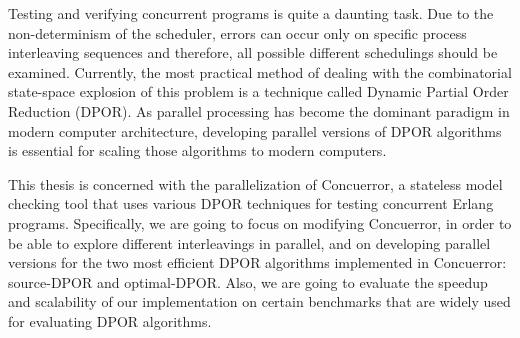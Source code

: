 Testing and verifying concurrent programs is quite a daunting task. Due to the non-determinism of the scheduler,
errors can occur only on specific process interleaving sequences and therefore, all possible different
schedulings should be examined. Currently, the most practical method of dealing with the combinatorial state-space
explosion of this problem is a technique called Dynamic Partial Order Reduction (DPOR). As parallel processing
has become the dominant paradigm in modern computer architecture, developing parallel versions of DPOR algorithms is essential 
for scaling those algorithms to modern computers.

This thesis is concerned with the parallelization of Concuerror, a stateless model checking tool that uses various
DPOR techniques for testing concurrent Erlang programs. Specifically, we are going to focus on modifying Concuerror, 
in order to be able to explore different interleavings in parallel, and on developing parallel
versions for the two most efficient DPOR algorithms implemented in Concuerror: source-DPOR and optimal-DPOR.
Also, we are going to evaluate the speedup and scalability of our implementation on certain benchmarks that
are widely used for evaluating DPOR algorithms.